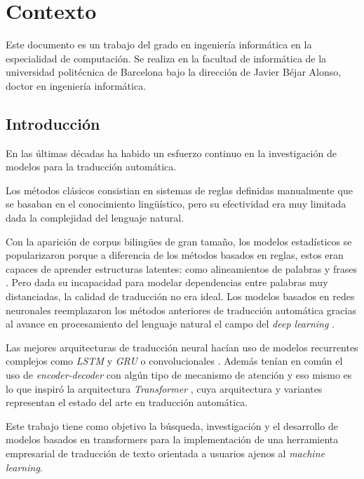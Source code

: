\section{Contexto}
Este documento es un trabajo del grado en ingeniería informática en la especialidad
de computación. Se realiza en la facultad de informática de la universidad politécnica
de Barcelona bajo la dirección de Javier Béjar Alonso, doctor en ingeniería informática.

\subsection{Introducción}\label{intro}
En las últimas décadas ha habido un esfuerzo continuo en la investigación de modelos para la traducción
automática.

Los métodos clásicos consistian en sistemas de reglas definidas manualmente que se
basaban en el conocimiento lingüístico, pero su efectividad era muy limitada dada la complejidad del lenguaje
natural.

Con la aparición de corpus bilingües de gran tamaño, los modelos estadísticos se popularizaron
porque a diferencia de los métodos basados en reglas, estos eran capaces de aprender
estructuras latentes: como alineamientos de palabras y frases
\cite{HistoryBrown1990ASA, HistoryKoehn2003Jan}. Pero dada su incapacidad para
modelar dependencias entre palabras muy distanciadas, la calidad de traducción no era ideal.
Los modelos basados en redes neuronales \cite{Historykalchbrenner-blunsom-2013, HistoryCho2014Jun,
HistorySutskever2014Sep, HistoryBahdanau2014Sep} reemplazaron los métodos anteriores de
traducción automática gracias al avance en procesamiento del lenguaje natural el campo
del \textit{deep learning} \cite{HistoryTan2020Dec}.

Las mejores arquitecturas de traducción neural hacían uso de modelos recurrentes complejos como
\textit{LSTM} \cite{HistoryHochreiter1997} y \textit{GRU} \cite{HistoryChung2014Dec} o
convolucionales \cite{HistoryGehring2016Nov}. Además tenían en común el uso
de \textit{encoder-decoder} con algún tipo de mecanismo de atención \cite{HistoryBahdanau2014Sep} y
eso mismo es lo que inspiró la arquitectura \textit{Transformer} \cite{Vaswani2017Jun},
cuya arquitectura y variantes representan el estado del arte en traducción automática.

Este trabajo tiene como objetivo la búsqueda, investigación y el desarrollo de modelos
basados en transformers para la implementación de una herramienta
empresarial de traducción de texto orientada a usuarios ajenos al \textit{machine learning}.

